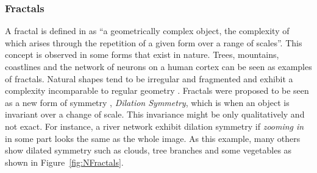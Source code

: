 
\subsubsection{Fractals} %
\label{ssub:fractals}


A fractal is defined in \cite{Ebert2002} as ``a geometrically complex object, the complexity of which arises through the repetition of a given form over a range of scales''.
This concept is observed in some forms that exist in nature. Trees, mountains, coastlines and the network of neurons on a human cortex can be seen as examples of fractals. Natural shapes tend to be irregular and fragmented and exhibit a complexity incomparable to regular geometry \cite{mandelbrot1984fractal}.
Fractals were proposed to be seen as a new form of symmetry \cite{Ebert2002}, \emph{Dilation Symmetry}, which is when an object is invariant over a change of scale. This invariance might be only qualitatively and not exact. For instance, a river network exhibit dilation symmetry if \textit{zooming in} in some part looks the same as the whole image. As this example, many others show dilated symmetry such as clouds, tree branches and some vegetables as shown in Figure~\ref{fig:NFractals}. 

